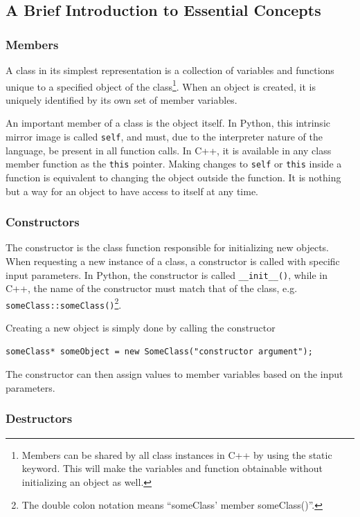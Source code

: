 \subsection{A Brief Introduction to Essential Concepts}

\subsubsection{Members}

A class in its simplest representation is a collection of variables and functions unique to a specified object of the class\footnote{Members can be shared by all class instances in C++ by using the static keyword. This will make the variables and function obtainable without initializing an object as well.}. When an object is created, it is uniquely identified by its own set of member variables.

An important member of a class is the object itself. In Python, this intrinsic mirror image is called \verb+self+, and must, due to the interpreter nature of the language, be present in all function calls. In C++, it is available in any class member function as the \verb+this+ pointer. Making changes to \verb+self+ or \verb+this+ inside a function is equivalent to changing the object outside the function. It is nothing but a way for an object to have access to itself at any time.

\subsubsection{Constructors}

The constructor is the class function responsible for initializing new objects. When requesting a new instance of a class, a constructor is called with specific input parameters. In Python, the constructor is called \verb+__init__()+, while in C++, the name of the constructor must match that of the class, e.g. \verb+someClass::someClass()+\footnote{The double colon notation means ``someClass' member someClass()''.}.

Creating a new object is simply done by calling the constructor

\begin{lstlisting}
someClass* someObject = new SomeClass("constructor argument");
\end{lstlisting}

The constructor can then assign values to member variables based on the input parameters.

\subsubsection{Destructors}

